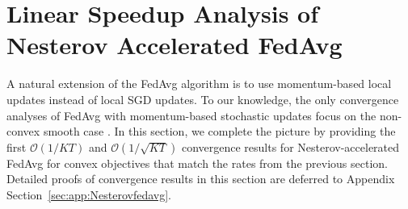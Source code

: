


\section{Linear Speedup Analysis of Nesterov Accelerated FedAvg}
\label{sec:Nesterov}

A natural extension of the FedAvg algorithm is to use momentum-based
local updates instead of local SGD updates. To our knowledge, the
only convergence analyses of FedAvg with momentum-based stochastic
updates focus on the non-convex smooth case \cite{huo2020faster,yu2019linear,li2018federated}.
In this section, we complete the picture by providing the first $\mathcal{O}(1/KT)$
and $\mathcal{O}(1/\sqrt{KT})$ convergence results for Nesterov-accelerated
FedAvg for convex objectives that match the rates from the previous section. Detailed proofs of convergence results in this section are deferred to Appendix Section~\ref{sec:app:Nesterovfedavg}.

